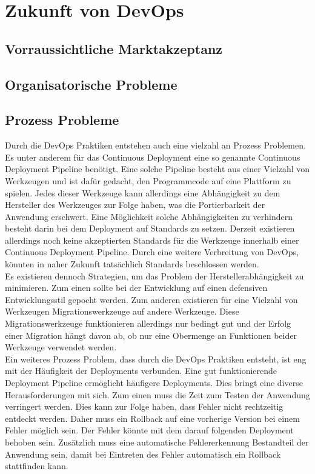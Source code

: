 \chapter{Zukunft von DevOps}

\section{Vorraussichtliche Marktakzeptanz}

\section{Organisatorische Probleme}

\section{Prozess Probleme}
Durch die DevOps Praktiken entstehen auch eine vielzahl an Prozess Problemen. Es unter anderem für das Continuous Deployment eine so genannte Continuous Deployment Pipeline benötigt. Eine solche Pipeline besteht aus einer Vielzahl von Werkzeugen und ist dafür gedacht, den Programmcode auf eine Plattform zu spielen. Jedes dieser Werkzeuge kann allerdings eine Abhängigkeit zu dem Hersteller des Werkzeuges zur Folge haben, was die Portierbarkeit der Anwendung erschwert. Eine Möglichkeit solche Abhängigkeiten zu verhindern besteht darin bei dem Deployment auf Standards zu setzen. Derzeit existieren allerdings noch keine akzeptierten Standards für die Werkzeuge innerhalb einer Continuous Deployment Pipeline. Durch eine weitere Verbreitung von DevOps, könnten in naher Zukunft tatsächlich Standards beschlossen werden. \\
Es existieren dennoch Strategien, um das Problem der Herstellerabhängigkeit zu minimieren. Zum einen sollte bei der Entwicklung auf einen defensiven Entwicklungsstil gepocht werden. Zum anderen existieren für eine Vielzahl von Werkzeugen Migrationswerkzeuge auf andere Werkzeuge. Diese Migrationswerkzeuge funktionieren allerdings nur bedingt gut und der Erfolg einer Migration hängt davon ab, ob nur eine Obermenge an Funktionen beider Werkzeuge verwendet werden. \\
Ein weiteres Prozess Problem, dass durch die DevOps Praktiken entsteht, ist eng mit der Häufigkeit der Deployments verbunden. Eine gut funktionierende Deployment Pipeline ermöglicht häufigere Deployments. Dies bringt eine diverse Herausforderungen mit sich. Zum einen muss die Zeit zum Testen der Anwendung verringert werden. Dies kann zur Folge haben, dass Fehler nicht rechtzeitig entdeckt werden. Daher muss ein Rollback auf eine vorherige Version bei einem Fehler möglich sein. Der Fehler könnte mit dem darauf folgenden Deployment behoben sein. Zusätzlich muss eine automatische Fehlererkennung Bestandteil der Anwendung sein, damit bei Eintreten des Fehler automatisch ein Rollback stattfinden kann. \\
